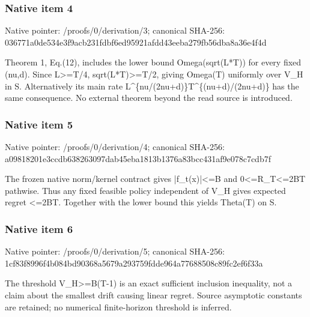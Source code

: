 \documentclass[10pt,a4paper]{article}
\begin{document}
\subsubsection{Native item 4}
Native pointer: /proofs/0/derivation/3; canonical SHA-256: 036771a0de534e3f9acb231fdbf6ed95921afdd43eeba279fb56dba8a36e4f4d

\begingroup\raggedright\sloppy Theorem 1,\allowbreak{} Eq.(12),\allowbreak{} includes the lower bound Omega(sqrt(L*T)) for every fixed (nu,\allowbreak{}d). Since L>=\allowbreak{}T/\allowbreak{}4,\allowbreak{} sqrt(L*T)>=\allowbreak{}T/\allowbreak{}2,\allowbreak{} giving Omega(T) uniformly over V\_\allowbreak{}H in S. Alternatively its main rate L\textasciicircum{}\{nu/\allowbreak{}(2nu+d)\}T\textasciicircum{}\{(nu+d)/\allowbreak{}(2nu+d)\} has the same consequence. No external theorem beyond the read source is introduced.\par\endgroup

\subsubsection{Native item 5}
Native pointer: /proofs/0/derivation/4; canonical SHA-256: a09818201e3ccdb638263097dab45eba1813b1376a83bcc431af9e078c7cdb7f

\begingroup\raggedright\sloppy The frozen native norm/\allowbreak{}kernel contract gives |f\_\allowbreak{}t(x)|<=\allowbreak{}B and 0<=\allowbreak{}R\_\allowbreak{}T<=\allowbreak{}2BT pathwise. Thus any fixed feasible policy independent of V\_\allowbreak{}H gives expected regret <=\allowbreak{}2BT. Together with the lower bound this yields Theta(T) on S.\par\endgroup

\subsubsection{Native item 6}
Native pointer: /proofs/0/derivation/5; canonical SHA-256: 1cf83f8996f4b084bd90368a5679a293759fdde964a77688508c89fc2ef6f33a

\begingroup\raggedright\sloppy The threshold V\_\allowbreak{}H>=\allowbreak{}B(T-1) is an exact sufficient inclusion inequality,\allowbreak{} not a claim about the smallest drift causing linear regret. Source asymptotic constants are retained;\allowbreak{} no numerical finite-horizon threshold is inferred.\par\endgroup
\end{document}
